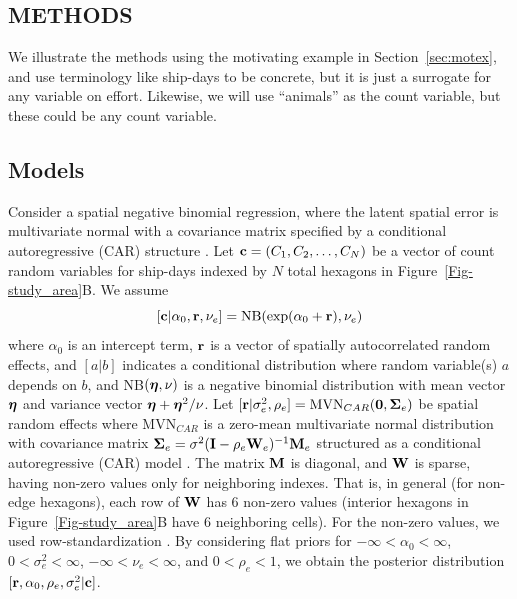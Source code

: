 \documentclass[11pt, titlepage]{article}
\begin{document}
\begin{spacing}{1.9}
\begin{flushleft}
\section{METHODS}

We illustrate the methods using the motivating example in Section~\ref{sec:motex}, and use terminology like ship-days to be concrete, but it is just a surrogate for any variable on effort.  Likewise, we will use ``animals'' as the count variable, but these could be any count variable.


\subsection{Models}

Consider a spatial negative binomial regression, where the latent spatial error is multivariate normal with a covariance matrix specified by a conditional autoregressive (CAR) structure \citep[e.g.,][]{VerHoefEtAl2018Spatialautoregressivemodels36}.  Let $\mathbf{c} = (C_{1}, C_{2}, \ldots, C_{N})$ be a vector of count random variables for ship-days indexed by $N$ total hexagons in Figure~\ref{Fig-study_area}B.  We assume
\begin{equation} \label{eq:poireg}
  [\mathbf{c}|\alpha_{0},\mathbf{r},\nu_{e}] = \textrm{NB}(\exp(\alpha_{0} + \mathbf{r}),\nu_{e})
\end{equation}
where $\alpha_{0}$ is an intercept term, $\mathbf{r}$ is a vector of spatially autocorrelated random effects, and $[a|b]$ indicates a conditional distribution where random variable(s) $a$ depends on $b$, and NB$(\mbox{\boldmath $\eta$},\nu)$ is a negative binomial distribution with mean vector $\mbox{\boldmath $\eta$}$ and variance vector $\mbox{\boldmath $\eta$} + \mbox{\boldmath $\eta$}^{2}/\nu$. Let $[\mathbf{r}|\sigma^{2}_{e}, \rho_{e}] = \textrm{MVN}_{CAR}(\mathbf{0},\mbox{\boldmath $\Sigma$}_{e})$ be spatial random effects where $\textrm{MVN}_{CAR}$ is a zero-mean multivariate normal distribution with covariance matrix $\mbox{\boldmath $\Sigma$}_{e} = \sigma^{2}(\mathbf{I} - \rho_{e}\mathbf{W}_{e})^{-1}\mathbf{M}_{e}$ structured as a conditional autoregressive (CAR) model \citep{Besag1974SpatialInteractionStatistical192}.  The matrix $\mathbf{M}$ is diagonal, and $\mathbf{W}$ is sparse, having non-zero values only for neighboring indexes.  That is, in general (for non-edge hexagons), each row of $\mathbf{W}$ has 6 non-zero values (interior hexagons in Figure~\ref{Fig-study_area}B have 6 neighboring cells).  For the non-zero values, we used row-standardization \citep{VerHoefEtAl2018Spatialautoregressivemodels36}.  By considering flat priors for $-\infty < \alpha_{0} < \infty$, $0 < \sigma^{2}_{e} < \infty$, $-\infty < \nu_{e} < \infty$, and $0 < \rho_{e} < 1$, we obtain the posterior distribution $[\mathbf{r}, \alpha_{0}, \rho_{e}, \sigma^{2}_{e}|\mathbf{c}]$.


\end{flushleft}
\end{spacing}
\end{document}
